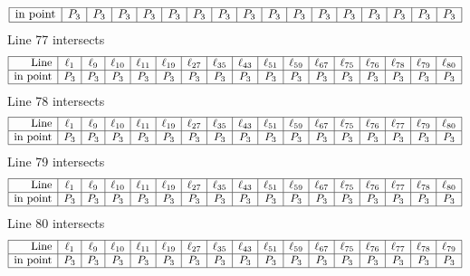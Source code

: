 \documentclass{article}
\begin{document}
{$$\begin{array}{|r*{16}{|c}|}
\hline
\mbox{in point}  & P_{3} & P_{3} & P_{3} & P_{3} & P_{3} & P_{3} & P_{3} & P_{3} & P_{3} & P_{3} & P_{3} & P_{3} & P_{3} & P_{3} & P_{3} & P_{3}\\
\hline
\end{array}
$$
Line 77 intersects 
$$
\begin{array}{|r*{16}{|c}|}
\hline
\mbox{Line}  & \ell_{1} & \ell_{9} & \ell_{10} & \ell_{11} & \ell_{19} & \ell_{27} & \ell_{35} & \ell_{43} & \ell_{51} & \ell_{59} & \ell_{67} & \ell_{75} & \ell_{76} & \ell_{78} & \ell_{79} & \ell_{80}\\
\hline
\mbox{in point}  & P_{3} & P_{3} & P_{3} & P_{3} & P_{3} & P_{3} & P_{3} & P_{3} & P_{3} & P_{3} & P_{3} & P_{3} & P_{3} & P_{3} & P_{3} & P_{3}\\
\hline
\end{array}
$$
Line 78 intersects 
$$
\begin{array}{|r*{16}{|c}|}
\hline
\mbox{Line}  & \ell_{1} & \ell_{9} & \ell_{10} & \ell_{11} & \ell_{19} & \ell_{27} & \ell_{35} & \ell_{43} & \ell_{51} & \ell_{59} & \ell_{67} & \ell_{75} & \ell_{76} & \ell_{77} & \ell_{79} & \ell_{80}\\
\hline
\mbox{in point}  & P_{3} & P_{3} & P_{3} & P_{3} & P_{3} & P_{3} & P_{3} & P_{3} & P_{3} & P_{3} & P_{3} & P_{3} & P_{3} & P_{3} & P_{3} & P_{3}\\
\hline
\end{array}
$$
Line 79 intersects 
$$
\begin{array}{|r*{16}{|c}|}
\hline
\mbox{Line}  & \ell_{1} & \ell_{9} & \ell_{10} & \ell_{11} & \ell_{19} & \ell_{27} & \ell_{35} & \ell_{43} & \ell_{51} & \ell_{59} & \ell_{67} & \ell_{75} & \ell_{76} & \ell_{77} & \ell_{78} & \ell_{80}\\
\hline
\mbox{in point}  & P_{3} & P_{3} & P_{3} & P_{3} & P_{3} & P_{3} & P_{3} & P_{3} & P_{3} & P_{3} & P_{3} & P_{3} & P_{3} & P_{3} & P_{3} & P_{3}\\
\hline
\end{array}
$$
Line 80 intersects 
$$
\begin{array}{|r*{16}{|c}|}
\hline
\mbox{Line}  & \ell_{1} & \ell_{9} & \ell_{10} & \ell_{11} & \ell_{19} & \ell_{27} & \ell_{35} & \ell_{43} & \ell_{51} & \ell_{59} & \ell_{67} & \ell_{75} & \ell_{76} & \ell_{77} & \ell_{78} & \ell_{79}\\
\hline
\mbox{in point}  & P_{3} & P_{3} & P_{3} & P_{3} & P_{3} & P_{3} & P_{3} & P_{3} & P_{3} & P_{3} & P_{3} & P_{3} & P_{3} & P_{3} & P_{3} & P_{3}\\
\hline
\end{array}
$$}
\end{document}
